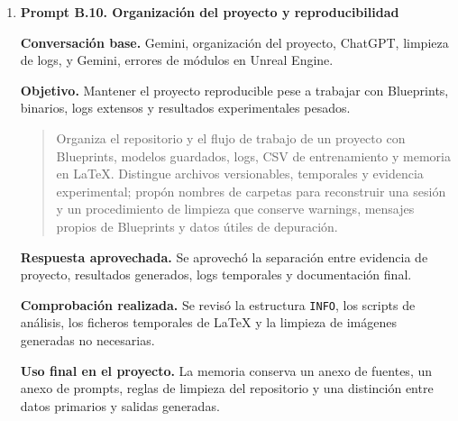 {\begin{enumerate}[leftmargin=*,itemsep=0.2\baselineskip,topsep=2pt,parsep=0pt,partopsep=0pt]
  \textbf{Respuesta aprovechada.} Se aprovechó el enfoque de ratios dependientes de población y la necesidad de guardar modelo, fitness y procedencia de forma coherente.

  \textbf{Comprobación realizada.} Se revisaron las descripciones de \texttt{EVOLUTIONMANAGER}, los backups de modelos y las métricas de genealogía por índice de coche.

  \textbf{Uso final en el proyecto.} La memoria describe las familias de mutación, el elitismo, \texttt{SessionCarModel}, \texttt{SuperCarModel} y la copia fechada del modelo anterior.

  \item \textbf{Prompt B.10. Organización del proyecto y reproducibilidad}

  \textbf{Conversación base.} Gemini, organización del proyecto, ChatGPT, limpieza de logs, y Gemini, errores de módulos en Unreal Engine.

  \textbf{Objetivo.} Mantener el proyecto reproducible pese a trabajar con Blueprints, binarios, logs extensos y resultados experimentales pesados.

  \promptDepurado
  \begin{quote}
  \small
  Organiza el repositorio y el flujo de trabajo de un proyecto con Blueprints, modelos guardados, logs, CSV de entrenamiento y memoria en LaTeX. Distingue archivos versionables, temporales y evidencia experimental; propón nombres de carpetas para reconstruir una sesión y un procedimiento de limpieza que conserve warnings, mensajes propios de Blueprints y datos útiles de depuración.
  \end{quote}

  \textbf{Respuesta aprovechada.} Se aprovechó la separación entre evidencia de proyecto, resultados generados, logs temporales y documentación final.

  \textbf{Comprobación realizada.} Se revisó la estructura \texttt{INFO}, los scripts de análisis, los ficheros temporales de LaTeX y la limpieza de imágenes generadas no necesarias.

  \textbf{Uso final en el proyecto.} La memoria conserva un anexo de fuentes, un anexo de prompts, reglas de limpieza del repositorio y una distinción entre datos primarios y salidas generadas.
\end{enumerate}
}
